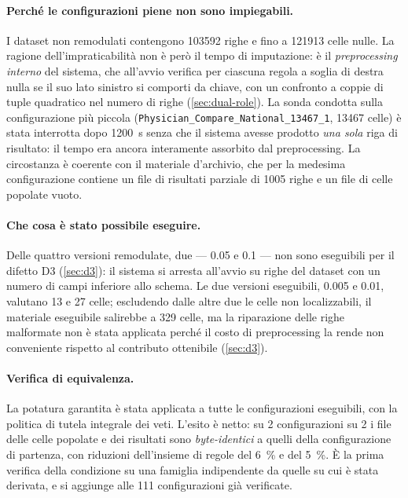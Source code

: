 \paragraph{Perché le configurazioni piene non sono impiegabili.} I dataset non remodulati
contengono \num{103592} righe e fino a \num{121913} celle nulle. La ragione dell'impraticabilità
non è però il tempo di imputazione: è il \emph{preprocessing interno} del sistema, che all'avvio
verifica per ciascuna regola a soglia di destra nulla se il suo lato sinistro si comporti da
chiave, con un confronto a coppie di tuple quadratico nel numero di righe
(\autoref{sec:dual-role}). La sonda condotta sulla configurazione più piccola
(\texttt{Physician\_Compare\_National\_13467\_1}, \num{13467} celle) è stata interrotta dopo
\SI{1200}{\second} senza che il sistema avesse prodotto \emph{una sola} riga di risultato: il
tempo era ancora interamente assorbito dal preprocessing. La circostanza è coerente con il
materiale d'archivio, che per la medesima configurazione contiene un file di risultati parziale di
\num{1005} righe e un file di celle popolate vuoto.

\paragraph{Che cosa è stato possibile eseguire.} Delle quattro versioni remodulate, due --- 0.05 e
0.1 --- non sono eseguibili per il difetto D3 (\autoref{sec:d3}): il sistema si arresta
all'avvio su righe del dataset con un numero di campi inferiore allo schema. Le due versioni
eseguibili, 0.005 e 0.01, valutano \num{13} e \num{27} celle; escludendo dalle altre due le celle
non localizzabili, il materiale eseguibile salirebbe a \num{329} celle, ma la riparazione delle
righe malformate non è stata applicata perché il costo di preprocessing la rende non conveniente
rispetto al contributo ottenibile (\autoref{sec:d3}).

\paragraph{Verifica di equivalenza.} La potatura garantita è stata applicata a tutte le
configurazioni eseguibili, con la politica di tutela integrale dei veti. L'esito è netto: su
\num{2} configurazioni su \num{2} i file delle celle popolate e dei risultati sono
\emph{byte-identici} a quelli della configurazione di partenza, con riduzioni dell'insieme di
regole del \SI{6}{\percent} e del \SI{5}{\percent}. È la prima verifica della condizione \Vtwo{}
su una famiglia indipendente da quelle su cui è stata derivata, e si aggiunge alle \num{111}
configurazioni già verificate.

